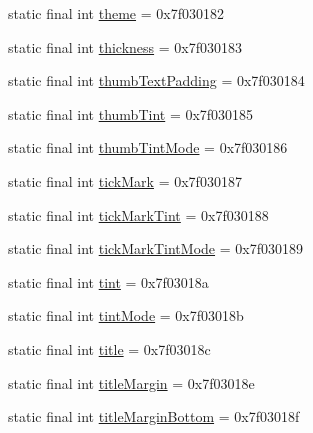 \begin{DoxyCompactItemize}
\item 
static final int \mbox{\hyperlink{classandroid_1_1support_1_1v7_1_1appcompat_1_1_r_1_1attr_a182cfd2eff31084c29174d1a2ab3ada2}{theme}} = 0x7f030182
\item 
static final int \mbox{\hyperlink{classandroid_1_1support_1_1v7_1_1appcompat_1_1_r_1_1attr_ad8eecd497c12c8ccd6ad92168b2e3aec}{thickness}} = 0x7f030183
\item 
static final int \mbox{\hyperlink{classandroid_1_1support_1_1v7_1_1appcompat_1_1_r_1_1attr_aec2704ebce5f1829511eee80aa7c16cf}{thumb\+Text\+Padding}} = 0x7f030184
\item 
static final int \mbox{\hyperlink{classandroid_1_1support_1_1v7_1_1appcompat_1_1_r_1_1attr_acfe04bf2bd21989662fb27261b896513}{thumb\+Tint}} = 0x7f030185
\item 
static final int \mbox{\hyperlink{classandroid_1_1support_1_1v7_1_1appcompat_1_1_r_1_1attr_a297f9715165a2c2b08288626b9168091}{thumb\+Tint\+Mode}} = 0x7f030186
\item 
static final int \mbox{\hyperlink{classandroid_1_1support_1_1v7_1_1appcompat_1_1_r_1_1attr_a938957cf3c3bced2a192ad119530c33c}{tick\+Mark}} = 0x7f030187
\item 
static final int \mbox{\hyperlink{classandroid_1_1support_1_1v7_1_1appcompat_1_1_r_1_1attr_a8d423c0748d4348dba773edc32f4ba66}{tick\+Mark\+Tint}} = 0x7f030188
\item 
static final int \mbox{\hyperlink{classandroid_1_1support_1_1v7_1_1appcompat_1_1_r_1_1attr_ab3e5ef28ce3471ab53b2318aa990f48a}{tick\+Mark\+Tint\+Mode}} = 0x7f030189
\item 
static final int \mbox{\hyperlink{classandroid_1_1support_1_1v7_1_1appcompat_1_1_r_1_1attr_ac10effefdca17643f5f38c68b2dd9802}{tint}} = 0x7f03018a
\item 
static final int \mbox{\hyperlink{classandroid_1_1support_1_1v7_1_1appcompat_1_1_r_1_1attr_af35dd65ec9d4f87eb9da6f17e05f5f0d}{tint\+Mode}} = 0x7f03018b
\item 
static final int \mbox{\hyperlink{classandroid_1_1support_1_1v7_1_1appcompat_1_1_r_1_1attr_a5c7c9d2df9addf881809723588ed65a5}{title}} = 0x7f03018c
\item 
static final int \mbox{\hyperlink{classandroid_1_1support_1_1v7_1_1appcompat_1_1_r_1_1attr_a166c6c95d482bb92ed6a1f88b311dd71}{title\+Margin}} = 0x7f03018e
\item 
static final int \mbox{\hyperlink{classandroid_1_1support_1_1v7_1_1appcompat_1_1_r_1_1attr_ad13d5190bf6d91b5f44074745bf45600}{title\+Margin\+Bottom}} = 0x7f03018f

\end{DoxyCompactItemize}
